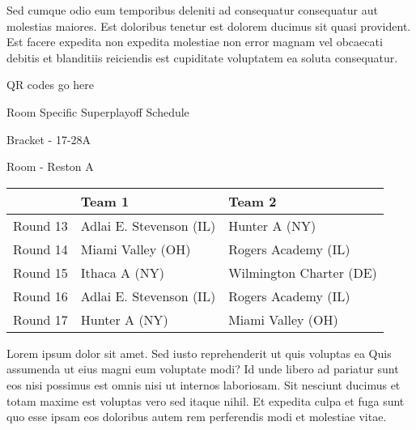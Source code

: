 \documentclass{article}%
\begin{document}
\newline%
Sed cumque odio eum temporibus deleniti ad consequatur consequatur aut molestias maiores. Est doloribus tenetur est dolorem ducimus sit quasi provident. Est facere expedita non expedita molestiae non error magnam vel obcaecati debitis et blanditiis reiciendis est cupiditate voluptatem ea soluta consequatur.%
\vspace*{140pt}%
\begin{center}%
\begin{Huge}%
QR codes go here%
\end{Huge}%
\end{center}%
\newpage%
\begin{center}%
\begin{Huge}%
Room Specific Superplayoff Schedule%
\end{Huge}%
\vspace*{8pt}%
\linebreak%
\begin{Large}%
Bracket {-} 17{-}28A%
\end{Large}%
\vspace*{8pt}%
\linebreak%
\vspace*{8pt}%
\begin{Large}%
Room {-} Reston A%
\end{Large}%
\end{center}%
%
\begin{tabularx}{\textwidth}{|c|Y|Y|}%
\hline%
&Team 1&Team 2\\%
\hline%
Round 13&Adlai E. Stevenson (IL)&Hunter A (NY)\\%
Round 14&Miami Valley (OH)&Rogers Academy (IL)\\%
Round 15&Ithaca A (NY)&Wilmington Charter (DE)\\%
Round 16&Adlai E. Stevenson (IL)&Rogers Academy (IL)\\%
Round 17&Hunter A (NY)&Miami Valley (OH)\\%
\hline%
\end{tabularx}%
\vspace*{8pt}%
\newline%
Lorem ipsum dolor sit amet. Sed iusto reprehenderit ut quis voluptas ea Quis assumenda ut eius magni eum voluptate modi? Id unde libero ad pariatur sunt eos nisi possimus est omnis nisi ut internos laboriosam. Sit nesciunt ducimus et totam maxime est voluptas vero sed itaque nihil. Et expedita culpa et fuga sunt quo esse ipsam eos doloribus autem rem perferendis modi et molestiae vitae.\newline%
\end{document}
